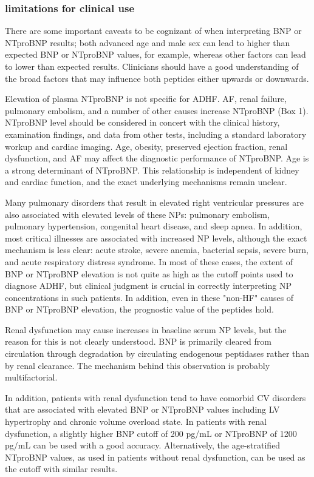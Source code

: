 \documentclass[14pt,a4paper,onecolumn]{extarticle}
\begin{document}
\subsubsection{limitations for clinical use}

There are some important caveats to be cognizant of when interpreting BNP or NTproBNP results; both advanced age and male sex can lead to higher than expected BNP or NTproBNP values, for example, whereas other factors can lead to lower than expected results. Clinicians should have a good understanding of the broad factors that may influence both peptides either upwards or downwards.\citep{Gaggin2014}

Elevation of plasma NTproBNP is not specific for ADHF. AF, renal failure, pulmonary embolism, and a number of other causes increase NTproBNP (Box 1). NTproBNP level should be considered in concert with the clinical history, examination findings, and data from other tests, including a standard laboratory workup and cardiac imaging. Age, obesity, preserved ejection fraction, renal dysfunction, and AF may affect the diagnostic performance of NTproBNP. Age is a strong determinant of NTproBNP. This relationship is independent of kidney and cardiac function, and the exact underlying mechanisms remain unclear.  \citep{Richards2018}

Many pulmonary disorders that result in elevated right ventricular pressures are also associated with elevated levels of these NPs: pulmonary embolism, pulmonary hypertension, congenital heart disease, and sleep apnea. In addition, most critical illnesses are associated with increased NP levels, although the exact mechanism is less clear: acute stroke, severe anemia, bacterial sepsis, severe burn, and acute respiratory distress syndrome. In most of these cases, the extent of BNP or NTproBNP elevation is not quite as high as the cutoff points used to diagnose ADHF, but clinical judgment is crucial in correctly interpreting NP concentrations in such patients. In addition, even in these "non-HF" causes of BNP or NTproBNP elevation, the prognostic value of the peptides hold. \citep{Gaggin2014}

Renal dysfunction may cause increases in baseline serum NP levels, but the reason for this is not clearly understood. BNP is primarily cleared from circulation through degradation by circulating endogenous peptidases rather than by renal clearance. The mechanism behind this observation is probably multifactorial. \citep{Maisel2018}

In addition, patients with renal dysfunction tend to have comorbid CV disorders that are associated with elevated BNP or NTproBNP values including LV hypertrophy and chronic volume overload state. In patients with renal dysfunction, a slightly higher BNP cutoff of 200 pg/mL or NTproBNP of 1200 pg/mL can be used with a good accuracy. Alternatively, the age-stratified NTproBNP values, as used in patients without renal dysfunction, can be used as the cutoff with similar results. \citep{Gaggin2014}
\end{document}

